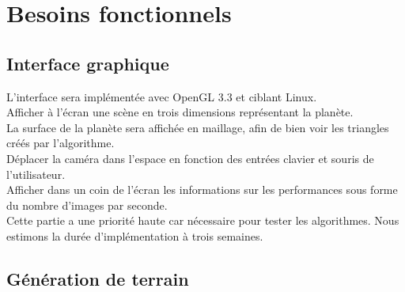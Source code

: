 \documentclass[12pt]{report}
\begin{document}



\section{Besoins fonctionnels}

\subsection{Interface graphique}

L'interface sera implémentée avec OpenGL 3.3 et ciblant Linux.\\
Afficher à l'écran une scène en trois dimensions représentant la planète.\\
La surface de la planète sera affichée en maillage, afin de bien voir
les triangles créés par l'algorithme.\\
Déplacer la caméra dans l'espace en fonction des entrées clavier et
souris de l'utilisateur.\\
Afficher dans un coin de l'écran les informations sur les performances
sous forme du nombre d'images par seconde.\\

Cette partie a une priorité haute car nécessaire pour tester les
algorithmes. Nous estimons la durée d'implémentation à trois semaines.\\


\subsection{Génération de terrain}
\end{document}
